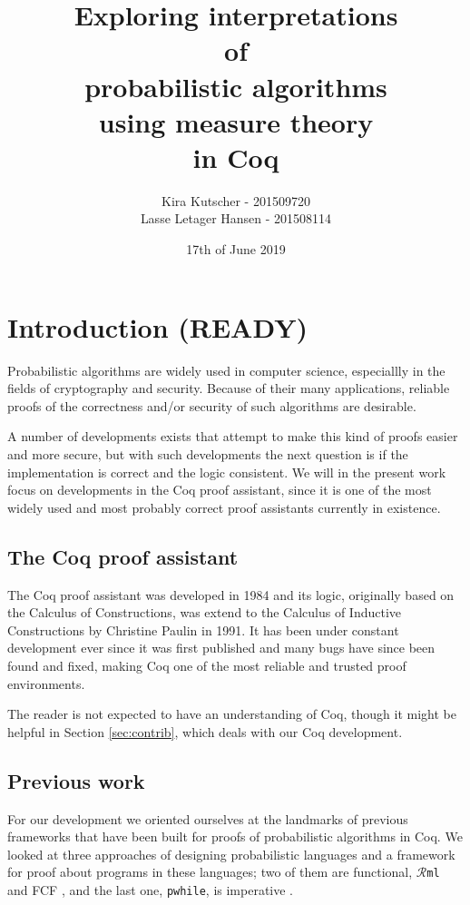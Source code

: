 \documentclass[11pt, leqno, titlepage]{article}
\author{Kira Kutscher - 201509720 \\
  Lasse Letager Hansen - 201508114
}
\date{17th of June 2019}
\title{Exploring interpretations \\of\\ probabilistic algorithms\\
  using measure theory \\in Coq}
\theoremstyle{definition}
\begin{document}

\newcommand\rml{$\mathcal{R}$\texttt{ml}} %
\newcommand\rmlx{$\mathcal{R}$\texttt{ml}*}
\newcommand\srml{\texttt{s}\rml}
\newcommand\M{\texttt{M}} %




\newpage

\tableofcontents
\newpage


\section{Introduction (READY)}
Probabilistic algorithms are widely used in computer science, especiallly in the
fields of cryptography and security. Because of their many applications, reliable
proofs of the correctness and/or security of such algorithms are desirable. 

A number of developments exists that attempt to make this kind of proofs easier and
more secure, but with such developments the next question is if the implementation is
correct and the logic consistent.  We will in the present work focus on developments
in the Coq proof assistant, since it is one of the most widely used and most probably
correct proof assistants currently in existence.

\subsection{The Coq proof assistant}
The Coq proof assistant was developed in 1984 \cite{coq-proof-ass} and its logic,
originally based on the Calculus of Constructions, was extend to the Calculus of
Inductive Constructions by Christine Paulin in 1991.  It has been under constant
development ever since it was first published and many bugs have since been found and
fixed, making Coq one of the most reliable and trusted proof environments.

The reader is not expected to have an understanding of Coq, though it might be
helpful in Section \ref{sec:contrib}, which deals with our Coq development. 

\subsection{Previous work}
For our development we oriented ourselves at the landmarks of previous frameworks
that have been built for proofs of probabilistic algorithms in Coq. We looked at
three approaches of designing probabilistic languages and a framework for proof about
programs in these languages; two of them are functional, \rml\ \cite{rml-paper} and
FCF \cite{fcf}, and the last one, \texttt{pwhile}, is imperative \cite{easy-crypt}.
\end{document}
